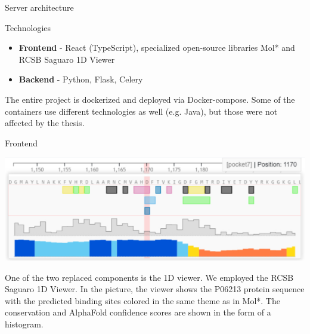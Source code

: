 \documentclass[portrait,a0paper,fontscale=0.25]{baposter}
\begin{document}
\begin{poster}
\begin{posterbox}[column=0, name=architecture, below=goals]{Server architecture}
\end{posterbox}

\begin{posterbox}[column=0, name=tech, below=architecture, headerColorOne=yellow!80!orange!95!black, boxColorOne=yellow!33]{Technologies}
\begin{itemize}
	\item \textbf{Frontend} - React (TypeScript), specialized open-source libraries Mol* and RCSB Saguaro 1D Viewer
	\item \textbf{Backend} - Python, Flask, Celery
\end{itemize}
The entire project is dockerized and deployed via Docker-compose. Some of the containers use different
technologies as well (e.g. Java), but those were not affected by the thesis.
\end{posterbox}

%
%


%
%
%

\begin{posterbox}[column=1, name=result1]{Frontend}
\begin{center}
	\includegraphics[width=0.8\linewidth]{img/1D.pdf}
\end{center}

One of the two replaced components is the 1D viewer. We employed the RCSB Saguaro 1D Viewer.
In the picture, the viewer shows the P06213 protein sequence with the predicted binding sites colored in the same theme as in Mol*.
The conservation and AlphaFold confidence scores are shown in the form of a histogram.


\end{posterbox}
\end{poster}
\end{document}
